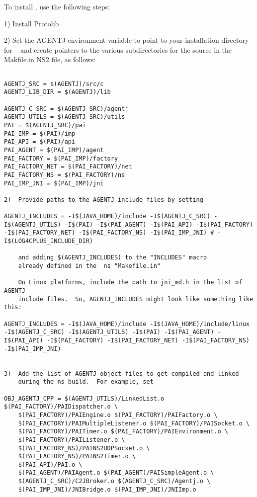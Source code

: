 To install \agentj, use the following steps:

1)  Install Protolib

2)  Set the AGENTJ environment variable to point to your installation 
directory for \agentj~ and create pointers to the various subdirectories 
for the source in the Makfile.in NS2 file, as follows:

\footnotesize
\begin{verbatim}

AGENTJ_SRC = $(AGENTJ)/src/c
AGENTJ_LIB_DIR = $(AGENTJ)/lib

AGENTJ_C_SRC = $(AGENTJ_SRC)/agentj
AGENTJ_UTILS = $(AGENTJ_SRC)/utils
PAI = $(AGENTJ_SRC)/pai
PAI_IMP = $(PAI)/imp
PAI_API = $(PAI)/api
PAI_AGENT = $(PAI_IMP)/agent
PAI_FACTORY = $(PAI_IMP)/factory
PAI_FACTORY_NET = $(PAI_FACTORY)/net
PAI_FACTORY_NS = $(PAI_FACTORY)/ns
PAI_IMP_JNI = $(PAI_IMP)/jni

2)  Provide paths to the AGENTJ include files by setting

AGENTJ_INCLUDES = -I$(JAVA_HOME)/include -I$(AGENTJ_C_SRC) -I$(AGENTJ_UTILS) -I$(PAI) -I$(PAI_AGENT) -I$(PAI_API) -I$(PAI_FACTORY) -I$(PAI_FACTORY_NET) -I$(PAI_FACTORY_NS) -I$(PAI_IMP_JNI) # -I$(LOG4CPLUS_INCLUDE_DIR)

    and adding $(AGENTJ_INCLUDES) to the "INCLUDES" macro
    already defined in the  ns "Makefile.in"
    
    On Linux platforms, include the path to jni_md.h in the list of AGENTJ 
    include files.  So, AGENTJ_INCLUDES might look like something like this:

AGENTJ_INCLUDES = -I$(JAVA_HOME)/include -I$(JAVA_HOME)/include/linux -I$(AGENTJ_C_SRC) -I$(AGENTJ_UTILS) -I$(PAI) -I$(PAI_AGENT) -I$(PAI_API) -I$(PAI_FACTORY) -I$(PAI_FACTORY_NET) -I$(PAI_FACTORY_NS) -I$(PAI_IMP_JNI) 
    

3)  Add the list of AGENTJ object files to get compiled and linked
    during the ns build.  For example, set

OBJ_AGENTJ_CPP = $(AGENTJ_UTILS)/LinkedList.o $(PAI_FACTORY)/PAIDispatcher.o \
	$(PAI_FACTORY)/PAIEngine.o $(PAI_FACTORY)/PAIFactory.o \
	$(PAI_FACTORY)/PAIMultipleListener.o $(PAI_FACTORY)/PAISocket.o \
	$(PAI_FACTORY)/PAITimer.o $(PAI_FACTORY)/PAIEnvironment.o \
	$(PAI_FACTORY)/PAIListener.o \
	$(PAI_FACTORY_NS)/PAINS2UDPSocket.o \
	$(PAI_FACTORY_NS)/PAINS2Timer.o \
	$(PAI_API)/PAI.o \
	$(PAI_AGENT)/PAIAgent.o $(PAI_AGENT)/PAISimpleAgent.o \
	$(AGENTJ_C_SRC)/C2JBroker.o $(AGENTJ_C_SRC)/Agentj.o \
	$(PAI_IMP_JNI)/JNIBridge.o $(PAI_IMP_JNI)/JNIImp.o


\end{verbatim}
